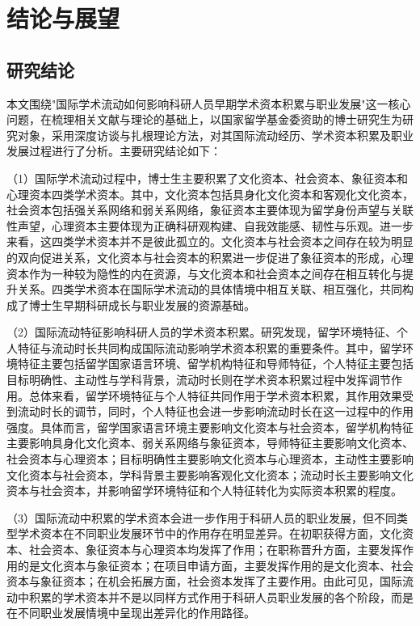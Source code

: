 \chapter{结论与展望}

\section{研究结论}

本文围绕"国际学术流动如何影响科研人员早期学术资本积累与职业发展"这一核心问题，在梳理相关文献与理论的基础上，以国家留学基金委资助的博士研究生为研究对象，采用深度访谈与扎根理论方法，对其国际流动经历、学术资本积累及职业发展过程进行了分析。主要研究结论如下：

（1）国际学术流动过程中，博士生主要积累了文化资本、社会资本、象征资本和心理资本四类学术资本。其中，文化资本包括具身化文化资本和客观化文化资本，社会资本包括强关系网络和弱关系网络，象征资本主要体现为留学身份声望与关联性声望，心理资本主要体现为正确科研观构建、自我效能感、韧性与乐观。进一步来看，这四类学术资本并不是彼此孤立的。文化资本与社会资本之间存在较为明显的双向促进关系，文化资本与社会资本的积累进一步促进了象征资本的形成，心理资本作为一种较为隐性的内在资源，与文化资本和社会资本之间存在相互转化与提升关系。四类学术资本在国际学术流动的具体情境中相互关联、相互强化，共同构成了博士生早期科研成长与职业发展的资源基础。

（2）国际流动特征影响科研人员的学术资本积累。研究发现，留学环境特征、个人特征与流动时长共同构成国际流动影响学术资本积累的重要条件。其中，留学环境特征主要包括留学国家语言环境、留学机构特征和导师特征，个人特征主要包括目标明确性、主动性与学科背景，流动时长则在学术资本积累过程中发挥调节作用。总体来看，留学环境特征与个人特征共同作用于学术资本积累，其作用效果受到流动时长的调节，同时，个人特征也会进一步影响流动时长在这一过程中的作用强度。具体而言，留学国家语言环境主要影响文化资本与社会资本，留学机构特征主要影响具身化文化资本、弱关系网络与象征资本，导师特征主要影响文化资本、社会资本与心理资本；目标明确性主要影响文化资本与心理资本，主动性主要影响文化资本与社会资本，学科背景主要影响客观化文化资本；流动时长主要影响文化资本与社会资本，并影响留学环境特征和个人特征转化为实际资本积累的程度。

（3）国际流动中积累的学术资本会进一步作用于科研人员的职业发展，但不同类型学术资本在不同职业发展环节中的作用存在明显差异。在初职获得方面，文化资本、社会资本、象征资本与心理资本均发挥了作用；在职称晋升方面，主要发挥作用的是文化资本与象征资本；在项目申请方面，主要发挥作用的是文化资本、社会资本与象征资本；在机会拓展方面，社会资本发挥了主要作用。由此可见，国际流动中积累的学术资本并不是以同样方式作用于科研人员职业发展的各个阶段，而是在不同职业发展情境中呈现出差异化的作用路径。

